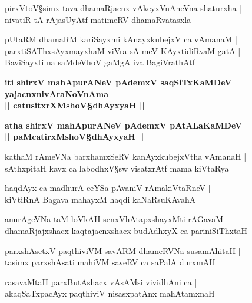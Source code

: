 \begin{shloka}
pirxVtoV\S simx tava dhamaRjacnx vAkeyxVnAneVna shaturxha\R {} |\\
nivatiR tA rAjasUyAtf matimeRV dhamaRvatasxla
\end{shloka}

\begin{shloka}
pUtaRM dhamaRM kariSayxmi kAnayxkubejxV ca vAmanaM |\\
parxtiSAThxsAyxmayxhaM viVra sA meV KAyxtidiRvaM gatA |\\
BaviSayxti na saMdeVhoV gaMgA iva BagiVrathAtf
\end{shloka}

\begin{center}
\textbf{iti shirxV mahApurANeV pAdemxV saqSiTxKaMDeV yajacnxnivAraNoVnAma}\\
\textbf{|| catusitxrXMshoV\S dhAyxyaH ||} 
\end{center}

\setcounter{shloka}{0}
\begin{center}
\textbf{\large atha shirxV mahApurANeV pAdemxV pAtALaKaMDeV}\\
\textbf{\large || paMcatirxMshoV\S dhAyxyaH ||} 
\end{center}

\begin{shloka}
kathaM rAmeVNa barxhamxSeRV kanAyxkubejxVtha vAmanaH |\\
sAthxpitaH kavx ca labodhxV\S sw visatxrAtf mama kiVtaRya
\end{shloka}

\begin{shloka}
haqdAyx ca madhurA ceYSa pAvaniV rAmakiVtaRneV |\\
kiVtiRnA Bagava\R{} mahayxM haqdi kaNaRsuKAvahA
\end{shloka}

\begin{shloka}
anurAgeVNa taM loVkAH senxVhAtapxshayxMti rAGavaM |\\
dhamaRjajxshacx kaqtajacnxshacx budAdhxyX ca pariniSiThxtaH 
\end{shloka}

\begin{shloka}
parxshAsetxV paqthiviVM savARM dhameRVNa susamAhitaH |\\
tasimx\R{} parxshAsati mahiVM saveRV ca saPalA durxmAH
\end{shloka}

\begin{shloka}
rasavaMtaH parxButAshacx vAsAMsi vividhAni ca |\\
akaqSaTxpacAyx paqthiviV nisasxpatAnx mahAtamxnaH 
\end{shloka}

